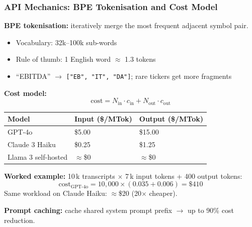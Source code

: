\documentclass[9pt,t]{beamer}
\begin{document}
\begin{frame}
\frametitle{API Mechanics: BPE Tokenisation and Cost Model}

\textbf{BPE tokenisation:} iteratively merge the most frequent adjacent symbol pair.
{\small
\begin{itemize}
  \item Vocabulary: 32k--100k sub-words
  \item Rule of thumb: 1 English word $\approx$ 1.3 tokens
  \item ``EBITDA'' $\to$ \texttt{["EB", "IT", "DA"]}; rare tickers get more fragments
\end{itemize}
}

\medskip
\textbf{Cost model:}
\[
\text{cost} = N_{\text{in}} \cdot c_{\text{in}} + N_{\text{out}} \cdot c_{\text{out}}
\]

\small
\begin{tabular}{lll}
\toprule
\textbf{Model} & \textbf{Input (\$/MTok)} & \textbf{Output (\$/MTok)} \\
\midrule
GPT-4o               & \$5.00 & \$15.00 \\
Claude 3 Haiku       & \$0.25 & \$1.25  \\
Llama 3 self-hosted  & $\approx$\$0 & $\approx$\$0 \\
\bottomrule
\end{tabular}

\normalsize
\medskip
\textbf{Worked example:} 10\,k transcripts $\times$ 7\,k input tokens + 400 output tokens:
\[
\text{cost}_{\text{GPT-4o}} = 10{,}000 \times (0.035 + 0.006) = \$410
\]
Same workload on Claude Haiku: $\approx$\$20 (20$\times$ cheaper).

\medskip
\textbf{Prompt caching:} cache shared system prompt prefix $\to$ up to 90\% cost reduction.
\end{frame}
\end{document}
